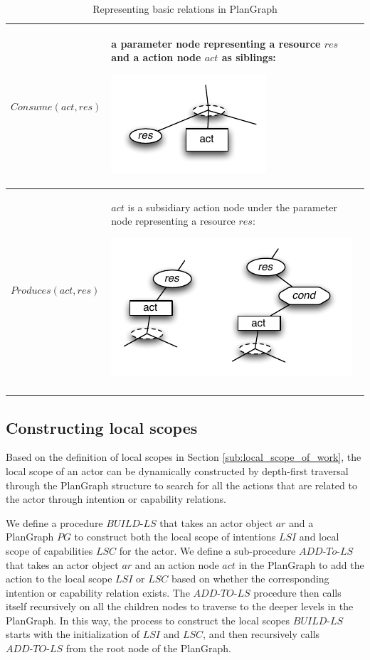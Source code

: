 {\begin{longtable}{>{\raggedright}p{1.5in}>{\raggedright}p{4in}}
\midrule 
$Consume(act, res)$ & a parameter node representing a resource $res$ and  a action node $act$ as siblings: 
\par \includegraphics{consumes.pdf}\tabularnewline
\midrule 
$Produces(act, res)$ &  $act$ is a subsidiary action node under the parameter node representing a resource $res$: 
\par \includegraphics{produces.pdf}\tabularnewline
\bottomrule
\caption{Representing basic relations in PlanGraph}
\label{tab:basic_rel_pg}
\end{longtable}
}

\subsection{Constructing local scopes} %
\label{sub:representing_local_scopes}
Based on the definition of local scopes in Section \ref{sub:local_scope_of_work}, the local scope of an actor can be dynamically constructed by depth-first traversal through the PlanGraph structure to search for all the actions that are related to the actor through intention or capability relations.

We define a procedure $BUILD\textrm{-}LS$ that takes an actor object $ar$ and a PlanGraph $PG$ to construct both the local scope of intentions $LSI$ and local scope of capabilities $LSC$ for the actor. We define a sub-procedure $ADD\textrm{-}To\textrm{-}LS$ that takes an actor object $ar$ and an action node $act$ in the PlanGraph to add the action to the local scope $LSI$ or $LSC$ based on whether the corresponding intention or capability relation exists. The $ADD\textrm{-}TO\textrm{-}LS$ procedure then calls itself recursively on all the children nodes to traverse to the deeper levels in the PlanGraph. In this way, the process to construct the local scopes $BUILD\textrm{-}LS$ starts with the initialization of $LSI$ and $LSC$, and then recursively calls $ADD\textrm{-}TO\textrm{-}LS$ from the root node of the PlanGraph.

